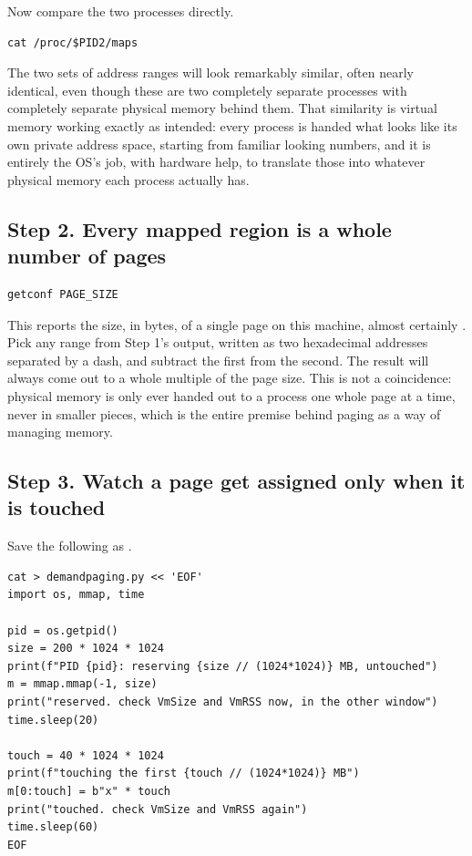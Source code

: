 \documentclass[11pt]{article}
\begin{document}
Now compare the two processes directly.

\begin{lstlisting}
cat /proc/$PID2/maps
\end{lstlisting}

The two sets of address ranges will look remarkably similar, often nearly identical, even though these are two completely separate processes with completely separate physical memory behind them. That similarity is virtual memory working exactly as intended: every process is handed what looks like its own private address space, starting from familiar looking numbers, and it is entirely the OS's job, with hardware help, to translate those into whatever physical memory each process actually has.

\subsection*{Step 2. Every mapped region is a whole number of pages}

\begin{lstlisting}
getconf PAGE_SIZE
\end{lstlisting}

This reports the size, in bytes, of a single page on this machine, almost certainly . Pick any range from Step 1's output, written as two hexadecimal addresses separated by a dash, and subtract the first from the second. The result will always come out to a whole multiple of the page size. This is not a coincidence: physical memory is only ever handed out to a process one whole page at a time, never in smaller pieces, which is the entire premise behind paging as a way of managing memory.

\subsection*{Step 3. Watch a page get assigned only when it is touched}

Save the following as .

\begin{lstlisting}
cat > demandpaging.py << 'EOF'
import os, mmap, time

pid = os.getpid()
size = 200 * 1024 * 1024
print(f"PID {pid}: reserving {size // (1024*1024)} MB, untouched")
m = mmap.mmap(-1, size)
print("reserved. check VmSize and VmRSS now, in the other window")
time.sleep(20)

touch = 40 * 1024 * 1024
print(f"touching the first {touch // (1024*1024)} MB")
m[0:touch] = b"x" * touch
print("touched. check VmSize and VmRSS again")
time.sleep(60)
EOF
\end{lstlisting}
\end{document}
